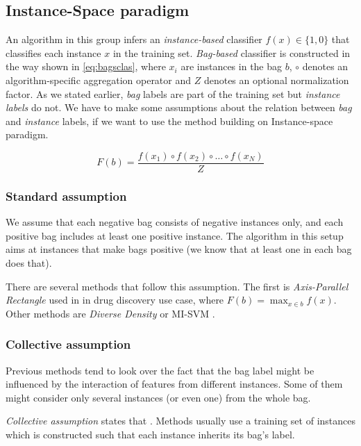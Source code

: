 \subsection{Instance-Space paradigm}
An algorithm in this group infers an \emph{instance-based} classifier $f(x) \in \{1,0\}$ that classifies each instance $x$ in the training set. \emph{Bag-based} classifier is constructed in the way shown in \ref{eq:bagsclas}, where $x_i$ are instances in the bag $b$, $\circ$ denotes an algorithm-specific aggregation operator and $Z$ denotes an optional normalization factor. As we stated earlier, \emph{bag} labels are part of the training set but \emph{instance labels} do not. We have to make some assumptions about the relation between \emph{bag} and \emph{instance} labels, if we want to use the method building on Instance-space paradigm.

\begin{equation} \label{eq:bagsclas}
    F(b)=\frac{f(x_1)\circ f(x_2)\circ\dots\circ f(x_N)}{Z}
\end{equation}

\subsubsection{Standard assumption}
We assume that each negative bag consists of negative instances only, and each positive bag includes at least one positive instance. The algorithm in this setup aims at instances that make bags positive (we know that at least one in each bag does that).

There are several methods that follow this assumption. The first is \emph{Axis-Parallel Rectangle} used in \cite{Dietterich1997} in drug discovery use case, where $F(b)=\max_{x\in b}f(x)$. Other methods are \emph{Diverse Density} \cite{Maron1998} or MI-SVM \cite{Andrews2003}.

\subsubsection{Collective assumption}
Previous methods tend to look over the fact that the bag label might be influenced by the interaction of features from different instances. Some of them might consider only several instances (or even one) from the whole bag.

\emph{Collective assumption} states that  \cite{Xu2003}. Methods usually use a training set of instances which is constructed such that each instance inherits its bag's label.

